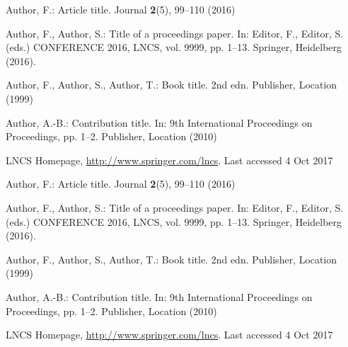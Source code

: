 \documentclass[20,twocolumn]{article}
\begin{document}
\begin{thebibliography}{8}
Author, F.: Article title. Journal \textbf{2}(5), 99--110 (2016)

Author, F., Author, S.: Title of a proceedings paper. In: Editor,
F., Editor, S. (eds.) CONFERENCE 2016, LNCS, vol. 9999, pp. 1--13.
Springer, Heidelberg (2016). 

Author, F., Author, S., Author, T.: Book title. 2nd edn. Publisher,
Location (1999)

Author, A.-B.: Contribution title. In: 9th International Proceedings
on Proceedings, pp. 1--2. Publisher, Location (2010)

LNCS Homepage, \url{http://www.springer.com/lncs}. Last accessed 4
Oct 2017

Author, F.: Article title. Journal \textbf{2}(5), 99--110 (2016)

Author, F., Author, S.: Title of a proceedings paper. In: Editor,
F., Editor, S. (eds.) CONFERENCE 2016, LNCS, vol. 9999, pp. 1--13.
Springer, Heidelberg (2016). 

Author, F., Author, S., Author, T.: Book title. 2nd edn. Publisher,
Location (1999)

Author, A.-B.: Contribution title. In: 9th International Proceedings
on Proceedings, pp. 1--2. Publisher, Location (2010)

LNCS Homepage, \url{http://www.springer.com/lncs}. Last accessed 4
Oct 2017

\end{thebibliography}
\end{document}
